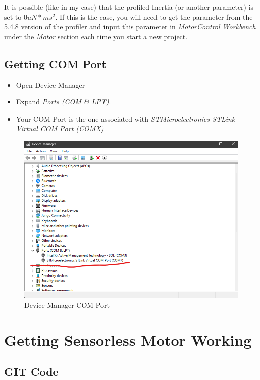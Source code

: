 \documentclass[10pt]{article}
\begin{document}
            It is possible (like in my case) that the profiled Inertia (or another parameter) is set to $0 uN*ms^2$. If this is the case, you will need to get the parameter from the 5.4.8 version of the profiler and input this parameter in \emph{MotorControl Workbench} under the \emph{Motor} section each time you start a new project.
		\FloatBarrier \subsection{Getting COM Port}
            \begin{itemize}
                \item Open Device Manager
                \item Expand \emph{Ports (COM \& LPT)}.
                \item Your COM Port is the one associated with \emph{STMicroelectronics STLink Virtual COM Port (COMX)}
            \end{itemize}
            \begin{figure}[H]
                \centerline{\includegraphics[width=\textwidth]{References/Device Manager COM Port.png}}
                \caption{Device Manager COM Port}
            \end{figure}
	\FloatBarrier \section{Getting Sensorless Motor Working}
		\FloatBarrier \subsection{GIT Code}
\end{document}
